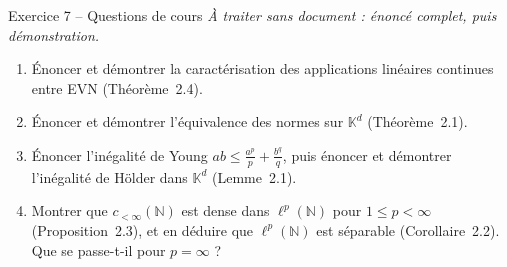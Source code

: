 \documentclass[11pt,a4paper]{article}
\newcommand{\N}{\mathbb{N}}
\newcommand{\K}{\mathbb{K}}
\theoremstyle{definition}
\begin{document}
\begin{exo}{Exercice 7 -- Questions de cours}
\emph{À traiter sans document : énoncé complet, puis démonstration.}
\begin{enumerate}[label=(\alph*)]
  \item Énoncer et démontrer la caractérisation des applications linéaires continues entre EVN (Théorème~2.4).
  \item Énoncer et démontrer l'équivalence des normes sur $\K^d$ (Théorème~2.1).
  \item Énoncer l'inégalité de Young $ab\le\frac{a^p}p+\frac{b^q}q$, puis énoncer et démontrer l'inégalité de Hölder dans $\K^d$ (Lemme~2.1).
  \item Montrer que $c_{<\infty}(\N)$ est dense dans $\ell^p(\N)$ pour $1\le p<\infty$ (Proposition~2.3), et en déduire que $\ell^p(\N)$ est séparable (Corollaire~2.2). Que se passe-t-il pour $p=\infty$ ?
\end{enumerate}
\end{exo}
\end{document}
